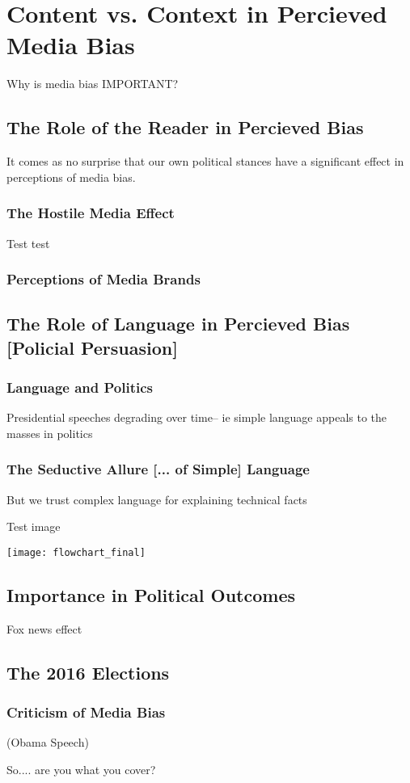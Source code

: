 \chapter{Content vs. Context in Percieved Media Bias}


Why is media bias IMPORTANT?


\section{The Role of the Reader in Percieved Bias}

It comes as no surprise that our own political stances have a significant effect in perceptions of media bias.

\subsection{The Hostile Media Effect}
Test test
\cite{vallone1985hostile}
\subsection{Perceptions of Media Brands}


\section{The Role of Language in Percieved Bias [Policial Persuasion]} 
\subsection{Language and Politics}
Presidential speeches degrading over time-- ie simple language appeals to the masses in politics
\subsection{The Seductive Allure [... of Simple] Language}
But we trust complex language for explaining technical facts

Test image

\texttt{[image: flowchart\_final]}


\section{Importance in Political Outcomes}
Fox news effect 

\section{The 2016 Elections} 
\subsection{Criticism of Media Bias} 
(Obama Speech)

So.... are you what you cover?








